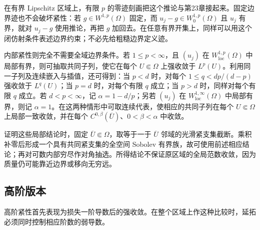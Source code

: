 \ProseParagraphBreak

在有界 Lipschitz 区域上，有限 \(p\) 的零迹刻画把这个推论与第23章接起来。固定边界迹也不会破坏紧性：若 \(g\in W^{1,p}(\Omega)\) 固定，而 \(u_j-g\in W_0^{1,p}(\Omega)\) 且 \(u_j\) 有界，就对 \(u_j-g\) 使用推论，再把 \(g\) 加回去。在任意有界开集上，同样可以用这个闭仿射条件表述边界约束；不必先给粗糙边界定义迹。

\ProseParagraphBreak

内部紧性则完全不需要全域边界条件。若 \(1\le p<\infty\)，且 \((u_j)\) 在 \(W^{1,p}_{\mathrm{loc}}(\Omega)\) 中局部有界，则可抽取共同子列，使它在每个 \(U\Subset\Omega\) 上强收敛于 \(L^p(U)\)。利用同一子列及连续嵌入与插值，还可得到：当 \(p<d\) 时，对每个 \(1\le q<dp/(d-p)\) 强收敛于 \(L^q(U)\)；当 \(p=d\) 时，对每个有限 \(q\) 成立；当 \(p>d\) 时，同样对每个有限 \(q\) 成立。若 \(d<p<\infty\)，记 \(\alpha=1-d/p\)；另若 \((u_j)\) 在 \(W^{1,\infty}_{\mathrm{loc}}(\Omega)\) 中局部有界，则记 \(\alpha=1\)。在这两种情形中可取连续代表，使相应的共同子列在每个 \(U\Subset\Omega\) 上局部一致收敛，并在每个 \(C^{0,\beta}(\overline U)\)、\(0<\beta<\alpha\) 中收敛。

\ProseParagraphBreak

证明这些局部结论时，固定 \(\overline U\Subset\Omega\)，取等于一于 \(\overline U\) 邻域的光滑紧支集截断。乘积补零后形成一个具有共同紧支集的全空间 Sobolev 有界族，故可使用前述相应结论；再对可数内部穷尽作对角抽选。所得结论不保证原区域的全局范数收敛，因为质量仍可能靠近边界或移向无穷远。

\subsection{高阶版本}
\label{b1:subsec:250204}

高阶紧性首先表现为损失一阶导数后的强收敛。在整个区域上作这种比较时，延拓必须同时控制相应阶数的弱导数。


